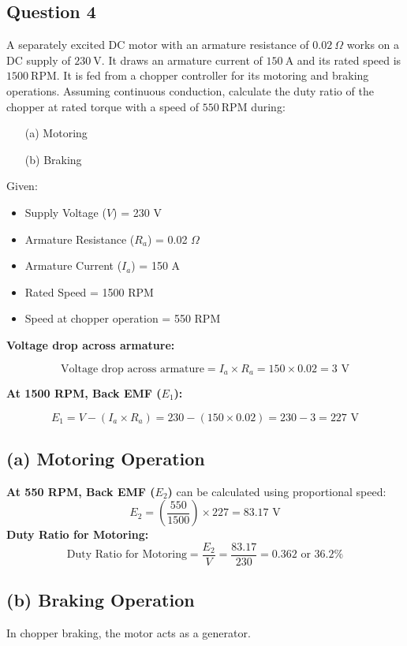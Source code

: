 \documentclass[12pt]{report}
\begin{document}
	
	\subsection*{Question 4}
	A separately excited DC motor with an armature resistance of $0.02 \ \Omega$ works on a DC supply of $230 \ \text{V}$. It draws an armature current of $150 \ \text{A}$ and its rated speed is $1500 \ \text{RPM}$. It is fed from a chopper controller for its motoring and braking operations. Assuming continuous conduction, calculate the duty ratio of the chopper at rated torque with a speed of $550 \ \text{RPM}$ during:
	\begin{enumerate}
		\item[(a)] Motoring
		\item[(b)] Braking
	\end{enumerate}
	
	
	
	Given:
	\begin{itemize}
		\item Supply Voltage (\( V \)) = 230 V
		\item Armature Resistance (\( R_a \)) = 0.02 \(\Omega\)
		\item Armature Current (\( I_a \)) = 150 A
		\item Rated Speed = 1500 RPM
		\item Speed at chopper operation = 550 RPM
	\end{itemize}
	

	\textbf{Voltage drop across armature:}	
	
	\[
	\text{Voltage drop across armature} = I_a \times R_a = 150 \times 0.02 = 3 \text{ V}
	\]	
	
	\textbf{At 1500 RPM, Back EMF (\( E_1 \)):}

	\[
	E_1 = V - (I_a \times R_a) = 230 - (150 \times 0.02) = 230 - 3 = 227 \text{ V}
	\]
	\subsection*{(a) Motoring Operation}
	\textbf{At 550 RPM, Back EMF (\( E_2 \))} can be calculated using proportional speed:
	\[
	E_2 = \left( \frac{550}{1500} \right) \times 227 = 83.17 \text{ V}
	\]
	\textbf{Duty Ratio for Motoring:}
	\[
	\text{Duty Ratio for Motoring} = \frac{E_2}{V} = \frac{83.17}{230} = 0.362 \text{ or } 36.2\%
	\]
	
	\subsection*{(b) Braking Operation}
	{In chopper braking, the motor acts as a generator.}
	
\end{document}
